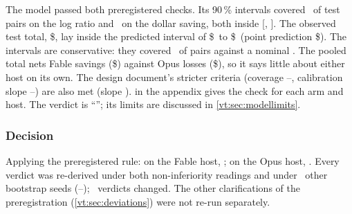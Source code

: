 The model passed both preregistered checks. Its 90\,\% intervals covered \MCCovLog\ of test pairs on the log
ratio and \MCCovUSD\ on the dollar saving, both inside [\CovLow, \CovHigh]. The observed test total,
\$\MCObserved, lay inside the predicted interval of \$\MCPILow\ to \$\MCPIHigh\ (point prediction
\$\MCPredicted). The intervals are conservative: they covered \MCCovLog\ of pairs against a nominal
\MCNominal. The pooled total nets Fable savings (\$\MCFableTotal) against Opus losses (\$\MCOpusTotal), so
it says little about either host on its own. The design document's stricter criteria (coverage
\DesignCovLow--\DesignCovHigh, calibration slope \DesignSlopeLow--\DesignSlopeHigh) are also met (slope
\MCSlope).  in the appendix gives the check for each arm and host. The verdict is
``\MCVerdict''; its limits are discussed in \cref{vt:sec:modellimits}.

\subsubsection{Decision}

Applying the preregistered rule: on the Fable host, \textbf{\DecisionFable}; on the Opus host,
\textbf{\DecisionOpus}. Every verdict was re-derived under both non-inferiority readings and under
\NSeeds\ other bootstrap seeds (\SeedLo--\SeedHi); \SeedsChanged\ verdicts changed. The other
clarifications of the preregistration (\cref{vt:sec:deviations}) were not re-run separately.
